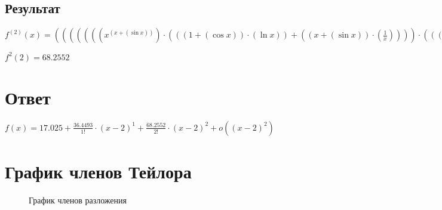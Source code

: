 \documentclass[12pt, letterpaper]{report}
\begin{document}
\subsection{Результат}
\begin{center} $f^{(2)}(x) = ({({({({({({({x}^{({x}+{(\sin{x})})})}\cdot{({({({1}+{(\cos{x})})}\cdot{(\ln{x})})}+{({({x}+{(\sin{x})})}\cdot{(\frac{1}{x})})})})}\cdot{({({({1}+{(\cos{x})})}\cdot{(\ln{x})})}+{({({x}+{(\sin{x})})}\cdot{(\frac{1}{x})})})})}+{({({x}^{({x}+{(\sin{x})})})}\cdot{({({({({-1}\cdot{(\sin{x})})}\cdot{(\ln{x})})}+{({({1}+{(\cos{x})})}\cdot{(\frac{1}{x})})})}+{({({({1}+{(\cos{x})})}\cdot{(\frac{1}{x})})}+{({({x}+{(\sin{x})})}\cdot{(\frac{-1}{({x}^{2})})})})})})})}\cdot{x})}+{({({x}^{({x}+{(\sin{x})})})}\cdot{({({({1}+{(\cos{x})})}\cdot{(\ln{x})})}+{({({x}+{(\sin{x})})}\cdot{(\frac{1}{x})})})})})}+{({({x}^{({x}+{(\sin{x})})})}\cdot{({({({1}+{(\cos{x})})}\cdot{(\ln{x})})}+{({({x}+{(\sin{x})})}\cdot{(\frac{1}{x})})})})})$ \end{center} 
\begin{center} $f^{2}(2) = 68.2552$ \end{center}
\section{Ответ}
\begin{center} $f(x) = 17.025 + \frac{36.4493}{1!}\cdot(x - 2)^{1} + \frac{68.2552}{2!}\cdot(x - 2)^{2} + o((x - 2)^{2})$ \end{center}
\section{График членов Тейлора}
\begin{figure}[h]
\centering
{}
\caption{График членов разложения}
\end{figure}
\end{document}
